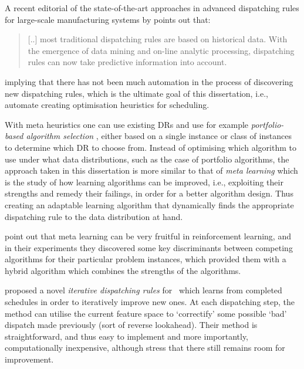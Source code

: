 A recent editorial of the state-of-the-art approaches in advanced dispatching rules for large-scale manufacturing systems by \citet{Chen13} points out that:
\begin{quote}
	[..] most traditional dispatching rules are based on historical data. With the emergence of data mining and on-line analytic processing, dispatching rules can now take predictive information into account.
\end{quote}
implying that there has not been much automation in the process of discovering new dispatching rules, which is the ultimate goal of this dissertation, i.e., automate creating optimisation heuristics for scheduling. 

With meta heuristics one can use existing DRs and use for example 
\emph{portfolio-based algorithm selection} \citep{Rice76,Gomes01}, either based 
on a single instance or class of instances \citep{Xu07} to determine which DR 
to choose from. 
Instead of optimising which algorithm to use under what data distributions, such as the case of portfolio algorithms, the approach taken in this dissertation is more similar to that of \emph{meta learning} \citep{Vilalta02} which is the study of how learning algorithms can be improved, i.e., exploiting their strengths and remedy their failings, in order for a better algorithm design. Thus creating an adaptable learning algorithm that dynamically finds the appropriate dispatching rule  to the data distribution at hand. 

\citet{Kalyanakrishnan11} point out that meta learning can be very fruitful in reinforcement learning, and in their experiments they discovered some key discriminants between competing algorithms for their particular problem instances, which provided them with a hybrid algorithm which combines the strengths of the algorithms.

\citet{Nguyen13} proposed a novel \emph{iterative dispatching rules} for \JSP\ 
which learns from completed schedules in order to iteratively improve new ones. 
At each dispatching step, the method can utilise the current feature space to 
`correctify' some possible `bad' dispatch made previously (sort of reverse 
lookahead).
Their method is straightforward, and thus easy to implement and more importantly, computationally inexpensive, although \citeauthor{Nguyen13} stress that there still remains room for improvement. 

